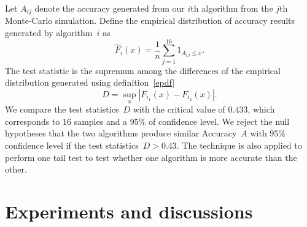 \documentclass[12pt]{article} %
\begin{document}
Let $A_{ij}$ denote the accuracy generated from our {$i$}th algorithm from the $j$th Monte-Carlo simulation. Define the empirical distribution of accuracy results generated by algorithm~$i$ as
\begin{equation}\label{epdf}
  \hat{F}_{i}(x)=\frac{1}{n}\sum_{j=1}^{16}1_{A_{iJ} \leq x}.
\end{equation}
The test statistic is the supremum among the differences of the empirical distribution generated using definition~\eqref{epdf} \citep{Walck:1996cca}
\begin{equation}\label{teststatistic}
D=\sup _{x}\left|F_{i_1}(x)-F_{i_2}(x)\right|.
\end{equation}
We compare the test statistics~$D$ with the critical value of $0.433$, which corresponds to $16$ samples and a $95\%$ of confidence level. We reject the null hypotheses that the two algorithms produce similar Accuracy~$A$ with $95\%$ confidence level if the test statistics~$D>0.43$. The technique is also applied to perform one tail test to test whether one algorithm is more accurate than the other.
\section{Experiments and discussions}\label{result}

\begin{table}
\centering
	\caption{Hypothesis test}
	\label{tab:HypothesisTest}
\end{table}
\end{document}
